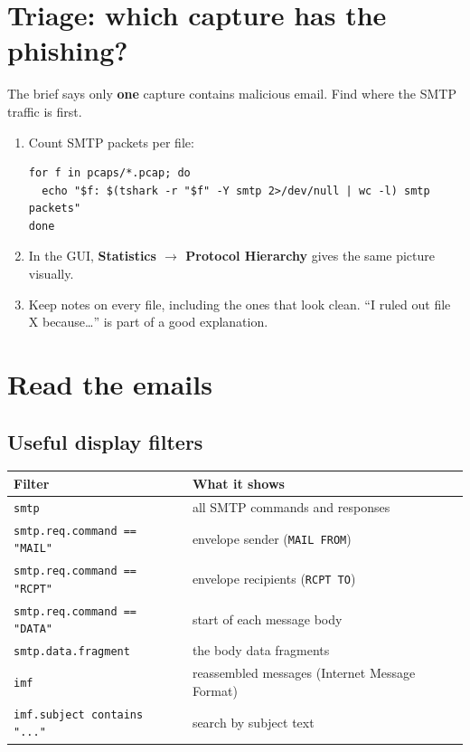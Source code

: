 \documentclass[11pt]{article}
\begin{document}
\section{Triage: which capture has the phishing?}
The brief says only \textbf{one} capture contains malicious email. Find where the SMTP traffic is first.

\begin{enumerate}[label=\textbf{2.\arabic*}]
  \item Count SMTP packets per file:
\begin{lstlisting}
for f in pcaps/*.pcap; do
  echo "$f: $(tshark -r "$f" -Y smtp 2>/dev/null | wc -l) smtp packets"
done
\end{lstlisting}
  \item In the GUI, \textbf{Statistics $\rightarrow$ Protocol Hierarchy} gives the same picture visually.
  \item Keep notes on every file, including the ones that look clean. ``I ruled out file X because\ldots''
        is part of a good explanation.
\end{enumerate}

\section{Read the emails}
\subsection*{Useful display filters}
\begin{center}
\begin{tabular}{@{}ll@{}}
\toprule
\textbf{Filter} & \textbf{What it shows} \\
\midrule
\texttt{smtp} & all SMTP commands and responses \\
\texttt{smtp.req.command == "MAIL"} & envelope sender (\texttt{MAIL FROM}) \\
\texttt{smtp.req.command == "RCPT"} & envelope recipients (\texttt{RCPT TO}) \\
\texttt{smtp.req.command == "DATA"} & start of each message body \\
\texttt{smtp.data.fragment} & the body data fragments \\
\texttt{imf} & reassembled messages (Internet Message Format) \\
\texttt{imf.subject contains "..."} & search by subject text \\
\bottomrule
\end{tabular}
\end{center}
\end{document}
